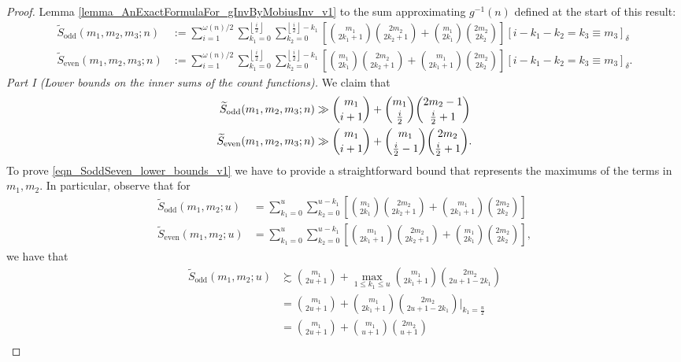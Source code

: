 \documentclass[11pt,reqno,a4letter]{article}
\numberwithin{figure}{section}
\numberwithin{table}{section}
\newcommand{\Iverson}[1]{\ensuremath{\left[#1\right]_{\delta}}}
\newcommand{\Floor}[2]{\ensuremath{\left\lfloor \frac{#1}{#2} \right\rfloor}}
\theoremstyle{plain}
\numberwithin{theorem}{section}
\theoremstyle{definition}
\begin{document}
\begin{proof}
Lemma \ref{lemma_AnExactFormulaFor_gInvByMobiusInv_v1} to the 
sum approximating $g^{-1}(n)$ defined at the start of this result: 
\begin{align*} 
\widetilde{S}_{\operatorname{odd}}(m_1, m_2, m_3; n) & := 
     \sum_{i=1}^{\omega(n)/2} \sum_{k_1=0}^{\Floor{i}{2}} \sum_{k_2=0}^{\Floor{i}{2}-k_1} \left[
     \binom{m_1}{2k_1+1} \binom{2m_2}{2k_2+1} + \binom{m_1}{2k_1} \binom{2m_2}{2k_2}
     \right] \Iverson{i-k_1-k_2 = k_3 \equiv m_3} \\ 
\widetilde{S}_{\operatorname{even}}(m_1, m_2, m_3; n) & := 
     \sum_{i=1}^{\omega(n)/2} \sum_{k_1=0}^{\Floor{i}{2}} \sum_{k_2=0}^{\Floor{i}{2}-k_1} \left[
     \binom{m_1}{2k_1} \binom{2m_2}{2k_2+1} + \binom{m_1}{2k_1+1} \binom{2m_2}{2k_2}
     \right] \Iverson{i-k_1-k_2 = k_3 \equiv m_3}. 
\end{align*} 
\textit{Part I (Lower bounds on the inner sums of the count functions). } 
We claim that 
\begin{align}
\label{eqn_SoddSeven_lower_bounds_v1} 
\widetilde{S}_{\operatorname{odd}}(m_1, m_2, m_3; n) & \gg 
     \binom{m_1}{i+1} + \binom{m_1}{\frac{i}{2}} \binom{2m_2-1}{\frac{i}{2}+1} \\ 
\notag 
\widetilde{S}_{\operatorname{even}}(m_1, m_2, m_3; n) & \gg 
     \binom{m_1}{i+1} + \binom{m_1}{\frac{i}{2}-1} \binom{2m_2}{\frac{i}{2}+1}. 
\end{align} 
To prove \eqref{eqn_SoddSeven_lower_bounds_v1} we have to provide a straightforward bound that 
represents the maximums of the terms in $m_1,m_2$. In particular, observe that for 
\begin{align*} 
\widetilde{S}_{\operatorname{odd}}(m_1, m_2; u) & = 
     \sum_{k_1=0}^{u} \sum_{k_2=0}^{u-k_1} \left[\binom{m_1}{2k_1} \binom{2m_2}{2k_2+1} + 
     \binom{m_1}{2k_1+1} \binom{2m_2}{2k_2}\right] \\ 
\widetilde{S}_{\operatorname{even}}(m_1, m_2; u) & = 
     \sum_{k_1=0}^{u} \sum_{k_2=0}^{u-k_1} \left[\binom{m_1}{2k_1+1} \binom{2m_2}{2k_2+1} + 
     \binom{m_1}{2k_1} \binom{2m_2}{2k_2}\right], 
\end{align*} 
we have that 
\begin{align*} 
\widetilde{S}_{\operatorname{odd}}(m_1, m_2; u) & \succsim \binom{m_1}{2u+1} + 
     \max_{1 \leq k_1 \leq u} \binom{m_1}{2k_1+1} \binom{2m_2}{2u+1-2k_1} \\ 
     & = \binom{m_1}{2u+1} + \binom{m_1}{2k_1+1} \binom{2m_2}{2u+1-2k_1} \Biggr\rvert_{k_1=\frac{u}{2}} \\ 
     & =  \binom{m_1}{2u+1} + \binom{m_1}{u+1} \binom{2m_2}{u+1} \\ 

\end{align*}
\end{proof}
\end{document}
